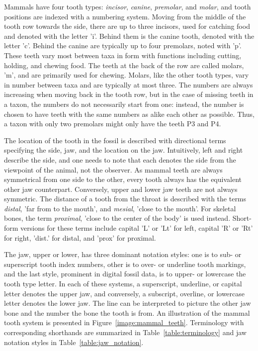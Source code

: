 \documentclass[english,twoside,openright]{UH_DS_MSc}
\begin{document}
Mammals have four tooth types: \textit{incisor}, \textit{canine}, \textit{premolar},
and \textit{molar}, and tooth positions are indexed with a numbering system. Moving from the middle of the tooth row
towards the side, there are up to three 
incisors, used for catching food and denoted with the letter 'i'. Behind them is the canine tooth, denoted with the letter 'c'. Behind the canine are typically up to four premolars, noted with 'p'. These 
teeth vary most between taxa in form with functions including cutting, holding, and chewing food.
The teeth at the back of the row are called molars, 'm', and are primarily used for chewing. Molars, like the other tooth types, 
vary in number between taxa and are typically at most three. The numbers are always increasing when moving back in the tooth row, but in
 the case of missing teeth in a taxon, the numbers do not necessarily start from one: instead, the number is chosen to 
have teeth with the same numbers as alike each other as possible. Thus, a taxon with only two premolars might only have the teeth P3 and P4.

The location of the tooth in the fossil is described with directional terms specifying the side, jaw, and the location on the jaw.
Intuitively, left and right describe the side, and one needs to note that each denotes the side from the viewpoint of the 
animal, not the observer. As mammal teeth are always symmetrical from one side to the other, every tooth always has the equivalent other jaw counterpart. Conversely, upper and lower jaw teeth are not always symmetric. The distance of a tooth from the throat 
is described with the terms \textit{distal}, 'far from to the mouth', and \textit{mesial}, 'close to the mouth'. For skeletal bones, the term \textit{proximal}, 
'close to the center of the body' is used instead.
Short-form versions for these terms include capital 'L' or 'Lt' for left, capital 'R' or 'Rt' for right, 'dist.' 
for distal, and 'prox' for proximal.

The jaw, upper or lower, has three dominant notation styles: one is to sub- or superscript tooth index numbers, other is to 
over- or underline tooth markings, and the last style, prominent in digital fossil data, is to upper- or lowercase the tooth type letter.
In each of these systems, a superscript, underline, or capital letter denotes the upper jaw, and conversely, a subscript, overline, or lowercase letter denotes the lower jaw. The line can be interpreted to picture the other jaw bone and the number the bone the tooth is from.
An illustration of the mammal tooth system is presented in Figure~\ref{image:mammal_teeth}. Terminology with corresponding shorthands are summarized in Table~\ref{table:terminology} and jaw notation styles in Table~\ref{table:jaw_notation}.
\end{document}
